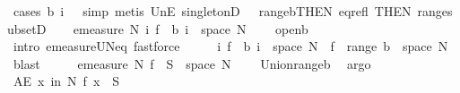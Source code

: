 \begin{isabellebody}
\ {\isacharparenleft}{\kern0pt}cases\ {\isachardoublequoteopen}b\ i\ {\isacharequal}{\kern0pt}\ {\isacharbraceleft}{\kern0pt}{\isacharbraceright}{\kern0pt}{\isachardoublequoteclose}{\isacharcomma}{\kern0pt}\ simp{\isacharparenright}{\kern0pt}\ {\isacharparenleft}{\kern0pt}metis\ UnE\ singletonD\ \ {\isacharasterisk}{\kern0pt}\ range{\isacharunderscore}{\kern0pt}b{\isacharbrackleft}{\kern0pt}THEN\ eq{\isacharunderscore}{\kern0pt}refl{\isacharcomma}{\kern0pt}\ THEN\ range{\isacharunderscore}{\kern0pt}subsetD{\isacharbrackright}{\kern0pt}{\isacharparenright}{\kern0pt}\isanewline
\ \ \isamarkupfalse%
\ {\isachardoublequoteopen}emeasure\ N\ {\isacharparenleft}{\kern0pt}{\isasymUnion}i{\isachardot}{\kern0pt}\ f\ {\isacharminus}{\kern0pt}{\isacharbackquote}{\kern0pt}\ b\ i\ {\isasyminter}\ space\ N{\isacharparenright}{\kern0pt}\ {\isacharequal}{\kern0pt}\ {}{\isachardoublequoteclose}\ \isamarkupfalse%
\ open{\isacharunderscore}{\kern0pt}b\ \isamarkupfalse%
\ {\isacharparenleft}{\kern0pt}intro\ emeasure{\isacharunderscore}{\kern0pt}UN{\isacharunderscore}{\kern0pt}eq{\isacharunderscore}{\kern0pt}{}{\isacharparenright}{\kern0pt}\ fastforce{\isacharplus}{\kern0pt}\isanewline
\ \ \isamarkupfalse%
\ \isamarkupfalse%
\ {\isachardoublequoteopen}{\isacharparenleft}{\kern0pt}{\isasymUnion}i{\isachardot}{\kern0pt}\ f\ {\isacharminus}{\kern0pt}{\isacharbackquote}{\kern0pt}\ b\ i\ {\isasyminter}\ space\ N{\isacharparenright}{\kern0pt}\ {\isacharequal}{\kern0pt}\ f\ {\isacharminus}{\kern0pt}{\isacharbackquote}{\kern0pt}\ {\isacharparenleft}{\kern0pt}{\isasymUnion}{\isacharparenleft}{\kern0pt}range\ b{\isacharparenright}{\kern0pt}{\isacharparenright}{\kern0pt}\ {\isasyminter}\ space\ N{\isachardoublequoteclose}\ \isamarkupfalse%
\ blast\isanewline
\ \ \isamarkupfalse%
\ \isamarkupfalse%
\ {\isachardoublequoteopen}emeasure\ N\ {\isacharparenleft}{\kern0pt}f\ {\isacharminus}{\kern0pt}{\isacharbackquote}{\kern0pt}\ {\isacharparenleft}{\kern0pt}{\isacharminus}{\kern0pt}S{\isacharparenright}{\kern0pt}\ {\isasyminter}\ space\ N{\isacharparenright}{\kern0pt}\ {\isacharequal}{\kern0pt}\ {}{\isachardoublequoteclose}\ \isamarkupfalse%
\ Union{\isacharunderscore}{\kern0pt}range{\isacharunderscore}{\kern0pt}b\ \isamarkupfalse%
\ argo\isanewline
\ \ \isamarkupfalse%
\ {\isachardoublequoteopen}AE\ x\ in\ N{\isachardot}{\kern0pt}\ f\ x\ {\isasymnotin}\ {\isacharminus}{\kern0pt}S{\isachardoublequoteclose}\ \isamarkupfalse%

\end{isabellebody}
